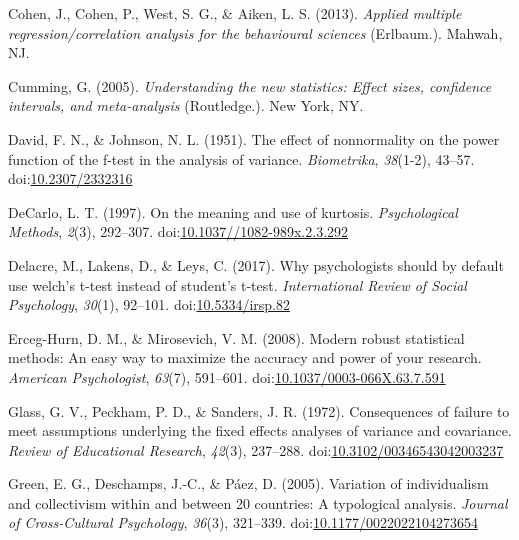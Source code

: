 \documentclass[man,floatsintext]{apa6}
\begin{document}
\leavevmode\hypertarget{ref-Cohen_et_al_2013}{}%
Cohen, J., Cohen, P., West, S. G., \& Aiken, L. S. (2013). \emph{Applied multiple regression/correlation analysis for the behavioural sciences} (Erlbaum.). Mahwah, NJ.

\leavevmode\hypertarget{ref-Cumming_2013}{}%
Cumming, G. (2005). \emph{Understanding the new statistics: Effect sizes, confidence intervals, and meta-analysis} (Routledge.). New York, NY.

\leavevmode\hypertarget{ref-David_and_Johnson_1951}{}%
David, F. N., \& Johnson, N. L. (1951). The effect of nonnormality on the power function of the f-test in the analysis of variance. \emph{Biometrika}, \emph{38}(1-2), 43--57. doi:\href{https://doi.org/10.2307/2332316}{10.2307/2332316}

\leavevmode\hypertarget{ref-DeCarlo_1997}{}%
DeCarlo, L. T. (1997). On the meaning and use of kurtosis. \emph{Psychological Methods}, \emph{2}(3), 292--307. doi:\href{https://doi.org/10.1037//1082-989x.2.3.292}{10.1037//1082-989x.2.3.292}

\leavevmode\hypertarget{ref-Delacre_et_al_2017}{}%
Delacre, M., Lakens, D., \& Leys, C. (2017). Why psychologists should by default use welch's t-test instead of student's t-test. \emph{International Review of Social Psychology}, \emph{30}(1), 92--101. doi:\href{https://doi.org/10.5334/irsp.82}{10.5334/irsp.82}

\leavevmode\hypertarget{ref-Erceg-Hurn_Mirosevich_2008}{}%
Erceg-Hurn, D. M., \& Mirosevich, V. M. (2008). Modern robust statistical methods: An easy way to maximize the accuracy and power of your research. \emph{American Psychologist}, \emph{63}(7), 591--601. doi:\href{https://doi.org/10.1037/0003-066X.63.7.591}{10.1037/0003-066X.63.7.591}

\leavevmode\hypertarget{ref-Glass_et_al_1972}{}%
Glass, G. V., Peckham, P. D., \& Sanders, J. R. (1972). Consequences of failure to meet assumptions underlying the fixed effects analyses of variance and covariance. \emph{Review of Educational Research}, \emph{42}(3), 237--288. doi:\href{https://doi.org/10.3102/00346543042003237}{10.3102/00346543042003237}

\leavevmode\hypertarget{ref-Green_et_al_2005}{}%
Green, E. G., Deschamps, J.-C., \& Páez, D. (2005). Variation of individualism and collectivism within and between 20 countries: A typological analysis. \emph{Journal of Cross-Cultural Psychology}, \emph{36}(3), 321--339. doi:\href{https://doi.org/10.1177/0022022104273654}{10.1177/0022022104273654}
\end{document}
